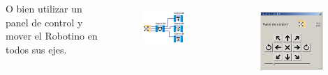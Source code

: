 \begin{frame}
	\begin{columns}
		O bien utilizar un panel de control y mover el Robotino en todos sus ejes.

		\begin{figure}
			\begin{center}
				\includegraphics[width=0.9\textwidth]{images/04-omniaccionamiento/01.png}
				\label{fig:omniaccionamiento-01}
			\end{center}
		\end{figure}
		\begin{figure}
			\begin{center}
				\includegraphics[width=0.9\textwidth]{images/04-omniaccionamiento/02.png}
				\label{fig:omniaccionamiento-02}
			\end{center}
		\end{figure}
	\end{columns}
\end{frame}

